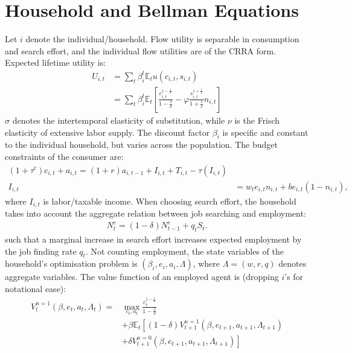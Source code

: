 




\section{Household and Bellman Equations}
Let $i$ denote the individual/household. Flow utility is separable in consumption and search effort, and the individual flow utilities are of the CRRA form. Expected lifetime utility is:
\begin{align*}
U_{i,t}&=\sum_{t}\beta_i^{t}\mathbb{E}_t u\left(c_{i,t},s_{i,t}\right)\\ 
&=\sum_{t}\beta_{i}^{t}\mathbb{E}_{t}\left[\frac{c_{i,t}^{1-\frac{1}{\sigma}}}{1-\frac{1}{\sigma}}-\varphi\frac{s_{i,t}^{1+\frac{1}{\nu}}}{1+\frac{1}{\nu}}n_{i,t}\right]
\end{align*} 
$\sigma$ denotes the intertemporal elasticity of substitution, while $\nu$ is the Frisch elasticity of extensive labor supply. The discount factor $\beta_{i}$ is specific and constant to the individual household, but varies across the population. 
The budget constraints of the consumer are:
\begin{gather*}
\left(1+\tau^{c}\right)c_{i,t}+a_{i,t}=\left(1+r\right)a_{i,t-1}+I_{i,t}+T_{i,t}-\tau\left(I_{i,t}\right) \\
I_{i,t}&=w_{t} e_{i,t}n_{i,t}+b e_{i,t}\left(1-n_{i,t}\right),
\end{gather*}
where $I_{i,t}$ is labor/taxable income. When choosing search effort, the household  takes into account the aggregate relation between job searching and employment: 
\begin{align*}
N_{t}^{e}=\left(1-\delta\right)N_{t-1}^{e}+q_{t}S_{t}.     
\end{align*}
such that a marginal increase in search effort increases expected employment by the job finding rate $q_t$. Not counting employment, the state variables of the household's optimisation problem is $\left(\beta_{i},e_{i},a_{i},\Lambda\right)$, where $\Lambda=\left(w,r,q\right)$ denotes aggregate variables. 
The value function of an employed agent is (dropping $i$'s for notational ease):
\begin{align*}
V_{t}^{n=1}\left(\beta,e_t,a_t,\Lambda_t \right)=&\max_{c_{t},a_{t}}\frac{c_{t}^{1-\frac{1}{\sigma}}}{1-\frac{1}{\sigma}} \\
&+\beta\mathbb{E}_{t}\left[\left(1-\delta\right)V_{t+1}^{n=1}\left(\beta,e_{t+1},a_{t+1},\Lambda_{t+1}\right)\right.\\
&\left.+\delta V_{t+1}^{n=0}\left(\beta,e_{t+1},a_{t+1},\Lambda_{t+1}\right)\right]
\end{align*}
